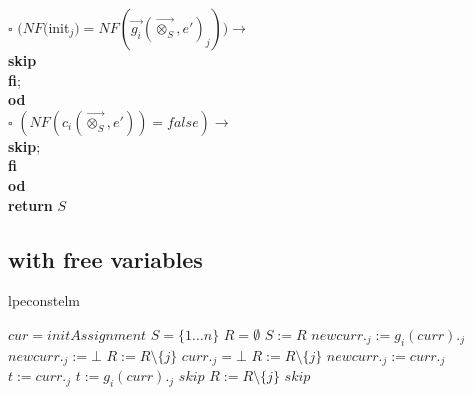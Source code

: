 \index{}\documentclass[a4paper,10pt]{article}
\theoremstyle{plain}
\theoremstyle{definition}
\newcommand{\ovr}{\overrightarrow}
\newcommand{\tb}{\textbf}
\newcommand{\sq}{$\square$}
\begin{document}
\begin{tabbing}
 \>	\>	\>  	\>    	\>        $\square$ \> $ (NF($init$_j) = NF(\ovr{g_i}(\ovr{\otimes_S}, e')_j)) \rightarrow$\\
  \>	\>	\> 	\>    	\>        \> \>  \tb{skip}\\	
  \>	\>	\> 	\> 	\>          \tb{fi}; \\
  \>	\>	\>	\> \tb{od}\\
  \>	\>	\sq 	\>  $(NF(c_i(\ovr{\otimes_S},e')) = false) \rightarrow$ \\
  \>	\>	\> 	\>\tb{skip};\\
  \>	\>	\tb{fi}\\
  \>	\tb{od} \\
 \tb{return} $S$
\end{tabbing} 


\newpage
\subsection{with free variables}
\begin{algorithm}[h]
\caption{lpeconstelm}
\begin{algorithmic}[1]
\STATE $cur = initAssignment$
\STATE $S = \lbrace 1 \ldots n \rbrace $
\STATE $R = \emptyset $
\REPEAT
    \STATE $S := R$
              \STATE $ newcurr._j := g_i(curr)._j $
            \ELSE
              \STATE $ newcurr._j := \bot $
              \STATE $ R:= R \setminus \lbrace j \rbrace $
            \ENDIF
          \ELSE %
              \STATE $curr._j = \bot$
              \STATE $R := R \setminus \lbrace j \rbrace$
              \STATE $newcurr._j := curr._j$
            \ENDIF
          \ENDIF 
        \ENDFOR
      \ENDIF
    \ENDFOR 
  \ENDWHILE \newline
    \STATE $t := curr._j$
        \STATE $ t := g_i(curr)._j $
        \STATE $skip$
        \STATE $ R := R \setminus \lbrace j \rbrace$
        \STATE $skip$
      \ENDIF
    \ENDFOR
  \ENDFOR
{}
\end{algorithmic}
\end{algorithm}
\newpage
\end{document}
